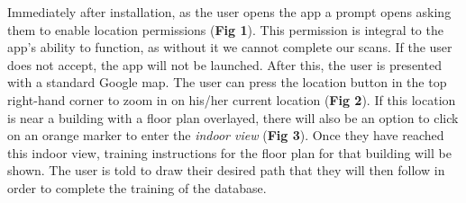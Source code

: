 \documentclass[10.8pt]{article}
\begin{document}
Immediately after installation, as the user opens the app a prompt opens asking them to enable location permissions (\textbf{Fig 1}). This permission is integral to the app's ability to function, as without it we cannot complete our scans. If the user does not accept, the app will not be launched. After this, the user is presented with a standard Google map. The user can press the location button in the top right-hand corner to zoom in on his/her current location (\textbf{Fig 2}). If this location is near a building with a floor plan overlayed, there will also be an option to click on an orange marker to enter the \textit{indoor view} (\textbf{Fig 3}). Once they have reached this indoor view, training instructions for the floor plan for that building will be shown. The user is told to draw their desired path that they will then follow in order to complete the training of the database.
\end{document}
